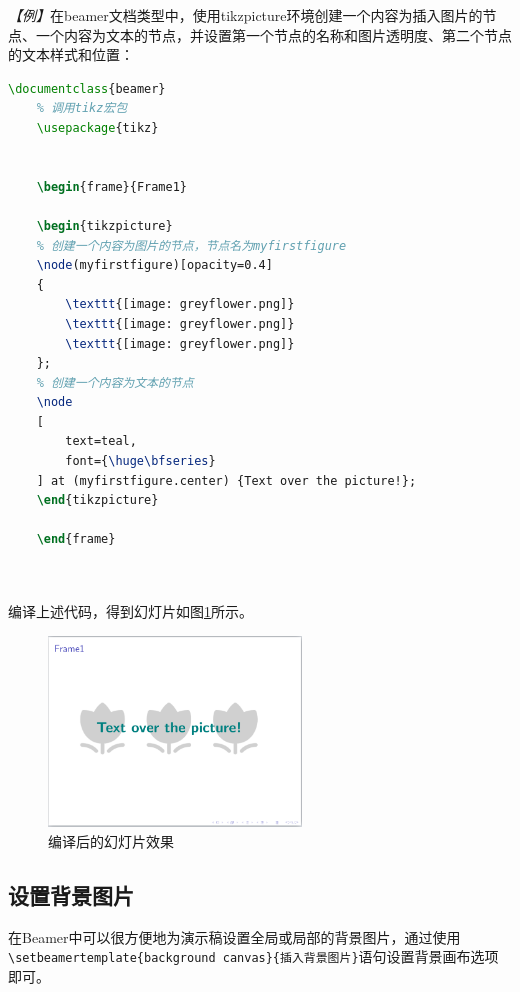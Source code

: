 \emph{【例】}在beamer文档类型中，使用tikzpicture环境创建一个内容为插入图片的节点、一个内容为文本的节点，并设置第一个节点的名称和图片透明度、第二个节点的文本样式和位置：
\begin{lstlisting}[language=TeX]
    \documentclass{beamer}
    % 调用tikz宏包
    \usepackage{tikz}

    
    \begin{frame}{Frame1}

    \begin{tikzpicture}
    % 创建一个内容为图片的节点，节点名为myfirstfigure
    \node(myfirstfigure)[opacity=0.4]
    {
        \texttt{[image: greyflower.png]}
        \texttt{[image: greyflower.png]}
        \texttt{[image: greyflower.png]}
    };
    % 创建一个内容为文本的节点
    \node
    [ 
        text=teal,
        font={\huge\bfseries}
    ] at (myfirstfigure.center) {Text over the picture!};
    \end{tikzpicture}

    \end{frame}

    
\end{lstlisting}

编译上述代码，得到幻灯片如图\ref{fig:948}所示。

\begin{figure}[htbp]
    \centering
    \includegraphics[width = 0.6\textwidth]{images/ch_9/eg6_8.png}
    \caption{编译后的幻灯片效果}
    \label{fig:948}
\end{figure}

\subsection{设置背景图片}

在Beamer中可以很方便地为演示稿设置全局或局部的背景图片，通过使用\texttt{\textbackslash{}setbeamertemplate\{background canvas\}\{插入背景图片\}}语句设置背景画布选项即可。

